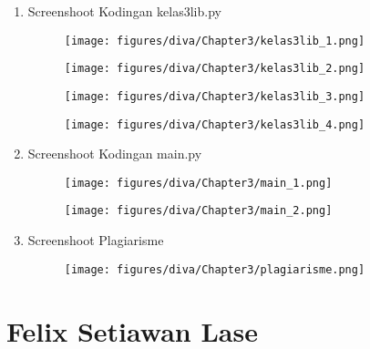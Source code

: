 \begin{enumerate}
\item Screenshoot Kodingan kelas3lib.py
\begin{figure}[H]
	\texttt{[image: figures/diva/Chapter3/kelas3lib\_1.png]}
	\centering
\end{figure}
\begin{figure}[H]
	\texttt{[image: figures/diva/Chapter3/kelas3lib\_2.png]}
	\centering
\end{figure}
\begin{figure}[H]
	\texttt{[image: figures/diva/Chapter3/kelas3lib\_3.png]}
	\centering
\end{figure}
\begin{figure}[H]
	\texttt{[image: figures/diva/Chapter3/kelas3lib\_4.png]}
	\centering
\end{figure}

\item Screenshoot Kodingan main.py
\begin{figure}[H]
	\texttt{[image: figures/diva/Chapter3/main\_1.png]}
	\centering
\end{figure}
\begin{figure}[H]
	\texttt{[image: figures/diva/Chapter3/main\_2.png]}
	\centering
\end{figure}

\item Screenshoot Plagiarisme
\begin{figure}[H]
	\texttt{[image: figures/diva/Chapter3/plagiarisme.png]}
	\centering
\end{figure}
\end{enumerate}
\section{Felix Setiawan Lase}

